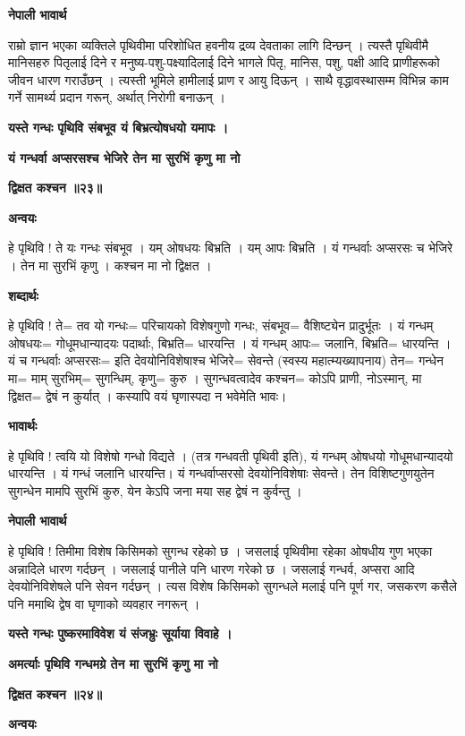 \documentclass[11pt, a5paper]{article}
\begin{document}
\textbf{नेपाली भावार्थ}

राम्रो ज्ञान भएका व्यक्तिले पृथिवीमा परिशोधित हवनीय द्रव्य देवताका लागि दिन्छन् । त्यस्तै पृथिवीमै मानिसहरु पितृलाई दिने र मनुष्य-पशु-पक्ष्यादिलाई दिने भागले पितृ, मानिस, पशु, पक्षी आदि प्राणीहरूको जीवन धारण गराउँछन् । त्यस्ती भूमिले हामीलाई प्राण र आयु दिऊन् । साथै वृद्धावस्थासम्म विभिन्न काम गर्ने सामर्थ्य प्रदान गरून्, अर्थात् निरोगी बनाऊन् ।

\textbf{यस्ते गन्धः पृथिवि संबभूव यं बिभ्रत्योषधयो यमापः ।}

\textbf{यं गन्धर्वा अप्सरसश्च भेजिरेे तेन मा सुरभिं कृणु मा नो}

\textbf{द्विक्षत कश्चन ॥२३॥}

\textbf{अन्वयः}

हे पृथिवि ! ते यः गन्धः संबभूव । यम् ओषधयः बिभ्रति । यम् आपः बिभ्रति । यं गन्धर्वाः अप्सरसः च भेजिरे । तेन मा सुरभिं कृणु । कश्चन मा नो द्विक्षत ।

\textbf{शब्दार्थः}

हे पृथिवि ! ते‍= तव यो गन्धः= परिचायको विशेषगुणो गन्धः, संबभूव= वैशिष्ट्येन प्रादुर्भूतः । यं गन्धम् ओषधयः= गोधूमधान्यादयः पदार्थाः, बिभ्रति= धारयन्ति । यं गन्धम् आपः= जलानि, बिभ्रति= धारयन्ति । यं च गन्धर्वाः अप्सरसः= इति देवयोनिविशेषाश्च भेजिरे= सेवन्ते (स्वस्य महात्म्यख्यापनाय) तेन= गन्धेन मा= माम् सुरभिम्= सुगन्धिम्, कृणु= कुरु । सुगन्धवत्वादेव कश्चन= कोऽपि प्राणी, नोऽस्मान्, मा द्विक्षत= द्वेषं न कुर्यात् । कस्यापि वयं घृणास्पदा न भवेमेति भावः।

\textbf{भावार्थः}

हे पृथिवि ! त्वयि यो विशेषो गन्धो विद्यते । (तत्र गन्धवती पृथिवी इति), यं गन्धम् ओषधयो गोधूमधान्यादयो धारयन्ति । यं गन्धं जलानि धारयन्ति। यं गन्धर्वाप्सरसो देवयोनिविशेषाः सेवन्ते। तेन विशिष्टगुणयुतेन सुगन्धेन मामपि सुरभिं कुरु, येन केऽपि जना मया सह द्वेषं न कुर्वन्तु ।

\textbf{नेपाली भावार्थ}

हे पृथिवि ! तिमीमा विशेष किसिमको सुगन्ध रहेको छ । जसलाई पृथिवीमा रहेका ओषधीय गुण भएका अन्नादिले धारण गर्दछन् । जसलाई पानीले पनि धारण गरेको छ । जसलाई गन्धर्व, अप्सरा आदि देवयोनिविशेषले पनि सेवन गर्दछन् । त्यस विशेष किसिमको सुगन्धले मलाई पनि पूर्ण गर, जसकरण कसैले पनि ममाथि द्वेष वा घृणाको व्यवहार नगरून् ।

\textbf{यस्ते गन्धः पुष्करमाविवेश यं संजभ्रुः सूर्याया विवाहे ।}

\textbf{अमर्त्याः पृथिवि गन्धमग्रे तेन मा सुरभिं कृणु मा नो}

\textbf{द्विक्षत कश्चन ॥२४॥}

\textbf{अन्वयः}
\end{document}
